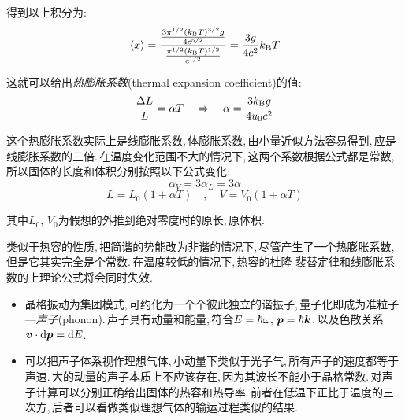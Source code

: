 得到以上积分为:
\[\langle x\rangle=\frac{\frac{3\pi^{1/2}(k_{\rm B}T)^{3/2}g}{4c^{5/2}}}{\frac{\pi^{1/2}(k_{\rm B}T)^{1/2}}{c^{1/2}}}=\frac{3g}{4c^2}k_{\rm B}T\]

这就可以给出\emph{热膨胀系数}(thermal expansion coefficient)的值:
\[\frac{\Delta L}{L}=\alpha T \quad\Rightarrow \quad \alpha=	\frac{3k_{\rm B}g}{4u_0c^2}\]

这个热膨胀系数实际上是线膨胀系数,\,体膨胀系数,\,由小量近似方法容易得到,\,应是线膨胀系数的三倍.\,在温度变化范围不大的情况下,\,这两个系数根据公式都是常数,\,所以固体的长度和体积分别按照以下公式变化:
\[\alpha_V=3\alpha_L=3\alpha\]
\[L=L_0(1+\alpha T)\quad,\quad V=V_0(1+\alpha T)\]

其中$L_0,\,V_0$为假想的外推到绝对零度时的原长,\,原体积.

类似于热容的性质,\,把简谐的势能改为非谐的情况下,\,尽管产生了一个热膨胀系数,\,但是它其实完全是个常数.\,在温度较低的情况下,\,热容的杜隆-裴替定律和线膨胀系数的上理论公式将会同时失效.







\begin{itemize}
	\item 晶格振动为集团模式,\,可约化为一个个彼此独立的谐振子,\,量子化即成为准粒子---\emph{声子}(phonon).\,声子具有动量和能量,\,符合$E=\hbar\omega,\,\boldsymbol{p}=\hbar\boldsymbol{k}$.\,以及色散关系$\boldsymbol{v}\cdot \textrm{d} \boldsymbol{p}=\textrm{d} E$.
	\item 可以把声子体系视作理想气体,\,小动量下类似于光子气,\,所有声子的速度都等于声速.\,大的动量的声子本质上不应该存在,\,因为其波长不能小于晶格常数.\,对声子计算可以分别正确给出固体的热容和热导率.\,前者在低温下正比于温度的三次方,\,后者可以看做类似理想气体的输运过程类似的结果.
\end{itemize}


